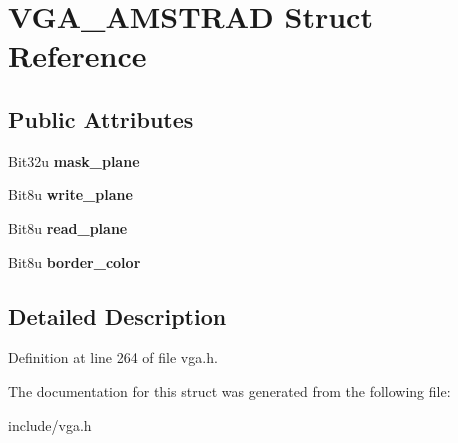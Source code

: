 \hypertarget{structVGA__AMSTRAD}{\section{V\-G\-A\-\_\-\-A\-M\-S\-T\-R\-A\-D Struct Reference}
\label{structVGA__AMSTRAD}
}
\subsection*{Public Attributes}
\begin{DoxyCompactItemize}
\item 
\hypertarget{structVGA__AMSTRAD_a3579c14ec7babb41e253a8310b9a71ed}{Bit32u {\bfseries mask\-\_\-plane}}\label{structVGA__AMSTRAD_a3579c14ec7babb41e253a8310b9a71ed}

\item 
\hypertarget{structVGA__AMSTRAD_a175865e5ad51119933b86b1a81f071dc}{Bit8u {\bfseries write\-\_\-plane}}\label{structVGA__AMSTRAD_a175865e5ad51119933b86b1a81f071dc}

\item 
\hypertarget{structVGA__AMSTRAD_adb93b9bfc436df9b90f1a7bc9d1dcfbe}{Bit8u {\bfseries read\-\_\-plane}}\label{structVGA__AMSTRAD_adb93b9bfc436df9b90f1a7bc9d1dcfbe}

\item 
\hypertarget{structVGA__AMSTRAD_ac7630605b97b058a383b751285e5de6e}{Bit8u {\bfseries border\-\_\-color}}\label{structVGA__AMSTRAD_ac7630605b97b058a383b751285e5de6e}

\end{DoxyCompactItemize}


\subsection{Detailed Description}


Definition at line 264 of file vga.\-h.



The documentation for this struct was generated from the following file\-:\begin{DoxyCompactItemize}
\item 
include/vga.\-h\end{DoxyCompactItemize}
